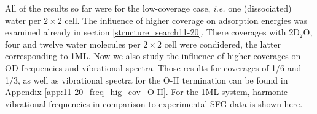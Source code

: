 \documentclass[11pt,DIV=13,BCOR=5mm,a4paper,headinclude]{scrbook}
\newcommand\todo[1]{\textcolor{red}{TODO: \textit{{#1}}}}
\begin{document}


All of the results so far were for the low-coverage case, \textit{i.e.} one (dissociated) water per $2\times 2$ cell.
The influence of higher coverage on adsorption energies was examined already in section \ref{structure_search11-20}.
There coverages with 2D$_2$O, four and twelve water molecules per $2\times 2$ cell were condidered, the latter corresponding to 1ML.
Now we also study the influence of higher coverages on OD frequencies and vibrational spectra.
Those results for coverages of 1/6 and 1/3, as well as vibrational spectra for the O-II termination can be found in Appendix \ref{app:11-20_freq_hig_cov+O-II}.
For the 1ML system, harmonic vibrational frequencies in comparison to experimental SFG data is shown here.
\end{document}
